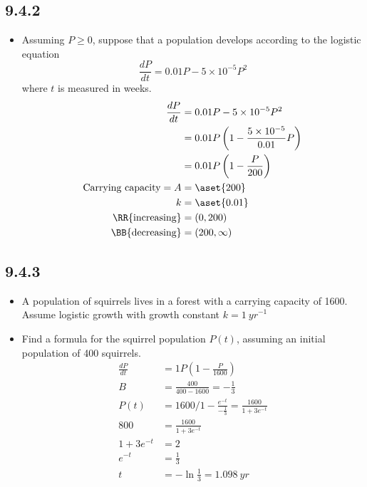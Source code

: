 \begin{itemize}
  \subsection{9.4.2}
  \begin{itemize}
    \item Assuming \( P \geq 0 \), suppose that a population develops according
      to the logistic equation
      \[%
      \frac{dP}{dt} = 0.01P - 5 \times 10^{-5}P^2
      \]%
      where \( t \) is measured in weeks.
      \begin{align*}
        \frac{dP}{dt} &= 0.01P - 5 \times 10^{-5}P^2 \\
        &= 0.01P \left( 1 - \frac{5 \times 10^{-5}}{0.01}P \right) \\
        &= 0.01P \left(1 - \frac{P}{200}\right) \\
        \text{Carrying capacity} = A &= \aset{200}\\
        k &= \aset{0.01} \\
        \text{\RR{increasing}} &= (0,200)  \\
        \text{\BB{decreasing}} &= (200, \infty)
      \end{align*}
  \end{itemize}

  \subsection{9.4.3}
  \begin{itemize}
    \item A population of squirrels lives in a forest with a carrying capacity
      of 1600. Assume logistic growth with growth constant \( k =
      \SI{1}{yr}^{-1} \)
    \item Find a formula for the squirrel population \( P(t) \), assuming an
      initial population of 400 squirrels.
      \begin{align*}
        \frac{dP}{dt} &= 1P\left( 1- \frac{P}{1600}\right) \\
        B &= \frac{400}{400-1600} = -\frac{1}{3}\\
        P(t) &= 1600 / 1 - \frac{e^{-t}}{-\frac{1}{3}} = \frac{1600}{1+3e^{-t}}\\
        800 &= \frac{1600}{1+3e^{-t}} \\
        1+3e^{-t} &= 2 \\
        e^{-t} &= \frac{1}{3} \\
        t &= -\ln \frac{1}{3} = \SI{1.098}{yr}
     \end{align*}
  \end{itemize}


\end{itemize}
